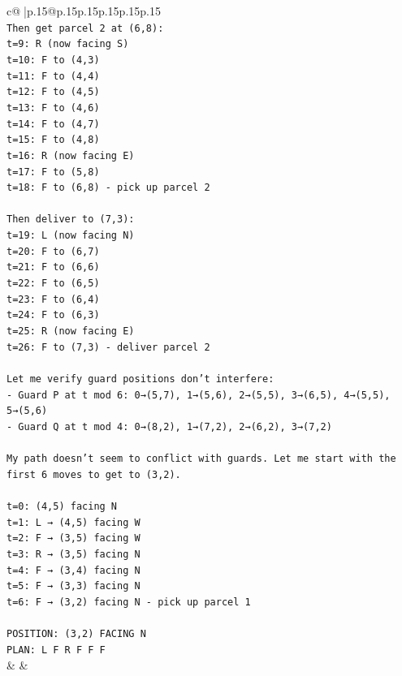 \documentclass{article}
\begin{document}
{\begin{supertabular}{c@{$\;$}|p{.15\linewidth}@{}p{.15\linewidth}p{.15\linewidth}p{.15\linewidth}p{.15\linewidth}p{.15\linewidth}}
{{{\\ 
\texttt{Then get parcel 2 at (6,8):} \\
\texttt{t=9: R (now facing S)} \\
\texttt{t=10: F to (4,3)} \\
\texttt{t=11: F to (4,4)} \\
\texttt{t=12: F to (4,5)} \\
\texttt{t=13: F to (4,6)} \\
\texttt{t=14: F to (4,7)} \\
\texttt{t=15: F to (4,8)} \\
\texttt{t=16: R (now facing E)} \\
\texttt{t=17: F to (5,8)} \\
\texttt{t=18: F to (6,8) {-} pick up parcel 2} \\
\\ 
\texttt{Then deliver to (7,3):} \\
\texttt{t=19: L (now facing N)} \\
\texttt{t=20: F to (6,7)} \\
\texttt{t=21: F to (6,6)} \\
\texttt{t=22: F to (6,5)} \\
\texttt{t=23: F to (6,4)} \\
\texttt{t=24: F to (6,3)} \\
\texttt{t=25: R (now facing E)} \\
\texttt{t=26: F to (7,3) {-} deliver parcel 2} \\
\\ 
\texttt{Let me verify guard positions don't interfere:} \\
\texttt{{-} Guard P at t mod 6: 0→(5,7), 1→(5,6), 2→(5,5), 3→(6,5), 4→(5,5), 5→(5,6)} \\
\texttt{{-} Guard Q at t mod 4: 0→(8,2), 1→(7,2), 2→(6,2), 3→(7,2)} \\
\\ 
\texttt{My path doesn't seem to conflict with guards. Let me start with the first 6 moves to get to (3,2).} \\
\\ 
\texttt{t=0: (4,5) facing N} \\
\texttt{t=1: L → (4,5) facing W} \\
\texttt{t=2: F → (3,5) facing W} \\
\texttt{t=3: R → (3,5) facing N} \\
\texttt{t=4: F → (3,4) facing N} \\
\texttt{t=5: F → (3,3) facing N} \\
\texttt{t=6: F → (3,2) facing N {-} pick up parcel 1} \\
\\ 
\texttt{POSITION: (3,2) FACING N} \\
\texttt{PLAN: L F R F F F} \\
            }
        }
    }
    & & \\ \\


\end{supertabular}}
\end{document}
